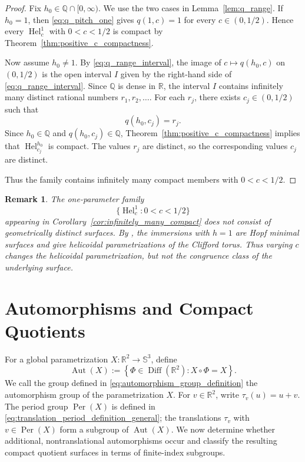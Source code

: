 \documentclass[a4paper,11pt]{amsart}
\numberwithin{equation}{section}
\theoremstyle{plain}
\newtheorem{rem}[thm]{Remark}
\begin{document}
\begin{proof}
Fix $h_0\in\mathbb Q\cap[0,\infty)$. We use the two cases in
Lemma~\ref{lem:q_range}. If $h_0=1$, then
\eqref{eq:q_pitch_one} gives $q(1,c)=1$ for every $c\in(0,1/2)$. Hence every $\operatorname{Hel}_c^1$ with $0<c<1/2$ is compact by
Theorem~\ref{thm:positive_c_compactness}.

Now assume $h_0\neq1$. By \eqref{eq:q_range_interval}, the image of
$c\mapsto q(h_0,c)$ on $(0,1/2)$ is the open interval
$I$ given by the right-hand side of \eqref{eq:q_range_interval}.
Since $\mathbb Q$ is dense in $\mathbb R$, the interval $I$ contains
infinitely many distinct rational numbers $r_1,r_2,\ldots$. For each $r_j$,
there exists $c_j\in(0,1/2)$ such that
\[
q(h_0,c_j)=r_j.
\]
Since $h_0\in\mathbb Q$ and $q(h_0,c_j)\in\mathbb Q$,
Theorem~\ref{thm:positive_c_compactness} implies that
$\operatorname{Hel}_{c_j}^{h_0}$ is compact. The values $r_j$ are distinct, so the corresponding values $c_j$ are
distinct.

Thus the family contains infinitely many compact members with $0<c<1/2$.
\end{proof}

\begin{rem}\label{rem:exceptional_pitch_h_one}
The one-parameter family
\[
\{\operatorname{Hel}_c^1:0<c<1/2\}
\]
appearing in Corollary~\ref{cor:infinitely_many_compact} does not consist
of geometrically distinct surfaces. By
\cite[Remark~5.8]{Castro2024}, the immersions with $h=1$ are Hopf minimal
surfaces and give helicoidal parametrizations of the Clifford torus.
Thus varying $c$ changes the helicoidal parametrization, but not the
congruence class of the underlying surface.
\end{rem}

\section{Automorphisms and Compact Quotients}
\label{sec:compact_quotients}

For a global parametrization
$X:\mathbb R^2\to\mathbb S^3$, define
\begin{equation}\label{eq:automorphism_group_definition}
\operatorname{Aut}(X)
:=
\left\{
\Phi\in\operatorname{Diff}(\mathbb R^2):X\circ\Phi=X
\right\}.
\end{equation}
We call the group defined in
\eqref{eq:automorphism_group_definition} the automorphism group of the
parametrization $X$.
For $v\in\mathbb R^2$, write $\tau_v(u)=u+v$. The period group
$\operatorname{Per}(X)$ is defined in
\eqref{eq:translation_period_definition_general}; the translations
$\tau_v$ with $v\in\operatorname{Per}(X)$ form a subgroup of
$\operatorname{Aut}(X)$. We now determine whether additional,
nontranslational automorphisms occur and classify the resulting compact
quotient surfaces in terms of finite-index subgroups.
\end{document}
